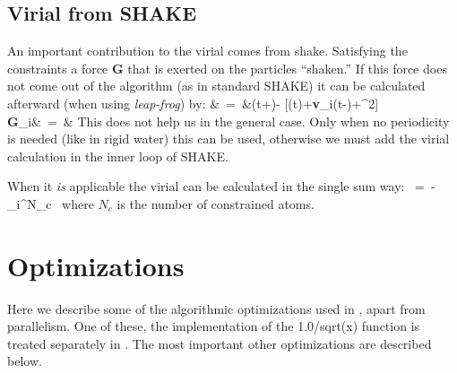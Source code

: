 \subsection{Virial from SHAKE}
An important contribution to the virial comes from shake. Satisfying 
the constraints a force {\bf G} that is exerted on the particles ``shaken.'' If this
force does not come out of the algorithm (as in standard SHAKE) it can be
calculated afterward (when using {\em leap-frog}) by:
\bea
\Delta\rvi&~=~&\rvi(t+\Dt)-
[\rvi(t)+{\bf v}_i(t-)\Dt+\Dt^2]	\\
{\bf G}_i&~=~&
\eea
This does not help us in the general case. Only when no periodicity
is needed (like in rigid water) this can be used, otherwise
we must add the virial calculation in the inner loop of SHAKE.

When it {\em is} applicable the virial can be calculated in the single sum way:
\beq
\Xi~=~-\half\sum_i^{N_c}~\rvi\otimes\Fvi
\eeq
where $N_c$ is the number of constrained atoms.




\section{Optimizations}
Here we describe some of the algorithmic optimizations used 
in {\gromacs}, apart from parallelism. 
One of these, the implementation of the 
1.0/sqrt(x) function is treated separately in .
The most important other optimizations are described below.

